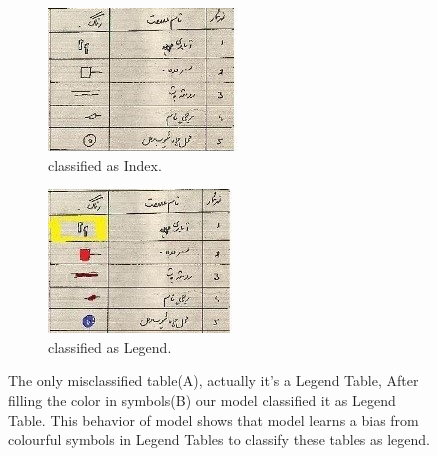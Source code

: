 \begin{figure}[!h]
\centering
\begin{subfigure}{0.47\linewidth}
  \centering
  \includegraphics[width=\linewidth,keepaspectratio]{1714 _index.jpg}
    \caption{classified as Index.}
    \label{}
\end{subfigure}
\begin{subfigure}{0.47\linewidth}
  \centering
  \includegraphics[width=\linewidth,keepaspectratio]{1714 _legend.jpg}
    \caption{classified as Legend.}
    \label{}
\end{subfigure}
\caption{The only misclassified table(A), actually it's a Legend Table, After filling the color in symbols(B) our model classified it as Legend Table. This behavior of model shows that model learns a bias from colourful symbols in Legend Tables to classify these tables as legend.}
\label{fig:missclassified_table}
\end{figure}
